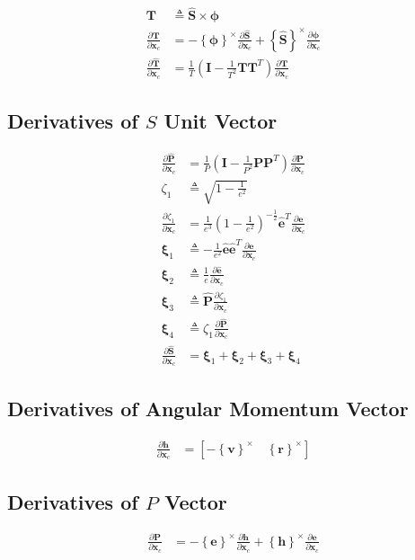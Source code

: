 \documentclass[]{article}
\newcommand{\vb}[1]{\bm{#1}} %
\newcommand{\vbh}[1]{\hat{\bm{#1}}} %
\newcommand{\pd}[2]{\frac{\partial #1}{\partial #2}} %
\newcommand{\crossmat}[1]{\left\{ {#1} \right\}^{\times}} %
\newcommand{\xc}[0]{\vb{x}_c}
\begin{document}
\begin{align}
\vb{T} &\triangleq \vbh{S} \times \vb{\phi} \\
\pd{\vb{T}}{\xc} &= -\crossmat{\vb{\phi}} \pd{\vbh{S}}{\xc} + \crossmat{\vbh{S}} \pd{\vb{\phi}}{\xc} \\
\pd{\vbh{T}}{\xc} &= \frac{1}{T} \left( \vb{I} - \frac{1}{T^2} \vb{T} \vb{T}^T \right) \pd{\vb{T}}{\xc}
\end{align}


\subsection{Derivatives of $S$ Unit Vector}
\label{sec:cartesian2bplanejac_sunit}

\begin{align}
	\pd{\vbh{P}}{\xc} &= \frac{1}{P} \left( \vb{I} - \frac{1}{P^2} \vb{P} \vb{P}^T \right) \pd{\vb{P}}{\xc} \\
	\zeta_1 &\triangleq \sqrt{1 - \frac{1}{e^2}} \\
	\pd{\zeta_1}{\xc} &= \frac{1}{e^3} \left( 1 - \frac{1}{e^2} \right)^{-\frac{1}{2}} \vbh{e}^T \pd{\vb{e}}{\xc} \\
	\vb{\xi}_1 &\triangleq - \frac{1}{e^2} \vbh{e} \vbh{e}^T \pd{\vb{e}}{\xc} \\
	\vb{\xi}_2 &\triangleq \frac{1}{e} \pd{\vbh{e}}{\xc} \\
	\vb{\xi}_3 &\triangleq \vbh{P} \pd{\zeta_1}{\xc} \\
	\vb{\xi}_4 &\triangleq \zeta_1 \pd{\vbh{P}}{\xc} \\
	\label{eq:d_sunit_d_xc_in}
	\pd{\vbh{S}}{\xc} &= \vb{\xi}_1 + \vb{\xi}_2 + \vb{\xi}_3 + \vb{\xi}_4
\end{align}

\subsection{Derivatives of Angular Momentum Vector}

\begin{align}
	\pd{\vb{h}}{\xc} &= \left[ -\crossmat{\vb{v}} \quad \crossmat{\vb{r}} \right]
\end{align}

\subsection{Derivatives of $P$ Vector}

\begin{align}
\pd{\vb{P}}{\xc} &= - \crossmat{\vb{e}} \pd{\vb{h}}{\xc} + \crossmat{\vb{h}} \pd{\vb{e}}{\xc}
\end{align}
\end{document}
